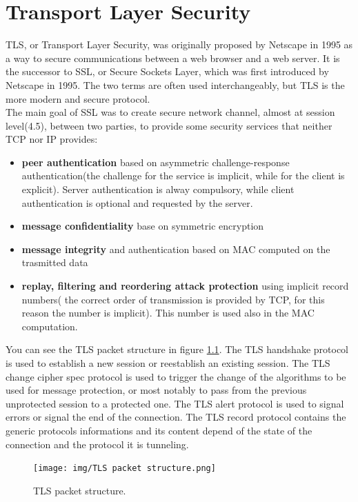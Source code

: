 \chapter{Transport Layer Security}
TLS, or Transport Layer Security, was originally proposed by Netscape
in 1995 as a way to secure communications between a web browser and a
web server. It is the successor to SSL, or Secure Sockets Layer, which
was first introduced by Netscape in 1995. The two terms are often used
interchangeably, but TLS is the more modern and secure protocol.\\ 
The main goal of SSL was to create secure network channel, almost at
session level(4.5), between two parties, to provide some security
services that neither TCP nor IP provides:
\begin{itemize}
  \item \textbf{peer authentication} based on asymmetric
    challenge-response authentication(the challenge for the service is
    implicit, while for the client is explicit). Server authentication
    is alway compulsory, while client authentication is optional and
    requested by the server.
  \item \textbf{message confidentiality} base on symmetric encryption
  \item \textbf{message integrity} and authentication based on MAC
    computed on the trasmitted data
  \item \textbf{replay, filtering and reordering attack protection}
    using implicit record numbers( the correct order of transmission
    is provided by TCP, for this reason the number is implicit). This
    number is used also in the MAC computation.

\end{itemize}

You can see the TLS packet structure in figure
\ref{fig:tls-packet-structure}.
The TLS handshake protocol is used to establish a new session or 
reestablish an existing session. The TLS change cipher spec protocol 
is used to trigger the change of the algorithms to be used for message 
protection, or most notably to pass from the previous unprotected 
session to a protected one. The TLS alert protocol is used to signal
errors or signal the end of the connection. 
The TLS record protocol contains the generic protocols informations
and its content depend of the state of the connection and the protocol
it is tunneling.
\begin{figure}[H]
    \centering
    \texttt{[image: img/TLS packet
    structure.png]}
    \caption{TLS packet structure.}
    \label{fig:tls-packet-structure}
\end{figure}

